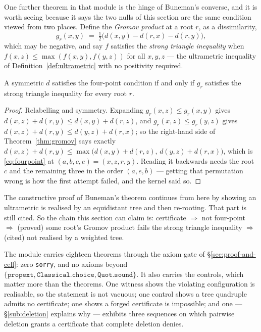 One further theorem in that module is the hinge of Buneman's converse, and it
is worth seeing because it says the two nulls of this section are the same
condition viewed from two places. Define the \emph{Gromov product} at a root
$r$, as a dissimilarity,
\[
  g_r(x,y) \;=\; \tfrac{1}{2}\big(d(x,y) - d(r,x) - d(r,y)\big),
\]
which may be negative, and say $f$ satisfies the \emph{strong triangle
inequality} when $f(x,z) \le \max(f(x,y), f(y,z))$ for all $x,y,z$ --- the
ultrametric inequality of Definition~\ref{def:ultrametric} with no positivity
required.

\begin{theorem}\label{thm:gromov}
A symmetric $d$ satisfies the four-point condition if and only if $g_r$
satisfies the strong triangle inequality for every root $r$.
\end{theorem}

\begin{proof}
Relabelling and symmetry. Expanding $g_r(x,z) \le g_r(x,y)$ gives
$d(x,z) + d(r,y) \le d(x,y) + d(r,z)$, and $g_r(x,z) \le g_r(y,z)$ gives
$d(x,z) + d(r,y) \le d(y,z) + d(r,x)$; so the right-hand side of
Theorem~\ref{thm:gromov} says exactly
$d(x,z) + d(r,y) \le \max\big(d(x,y)+d(r,z),\, d(y,z)+d(r,x)\big)$, which is
\eqref{eq:fourpoint} at $(a,b,c,e) = (x,z,r,y)$. Reading it backwards needs the
root $c$ and the remaining three in the order $(a,e,b)$ --- getting that
permutation wrong is how the first attempt failed, and the kernel said so.
\end{proof}

The constructive proof of Buneman's theorem continues from here by showing an
ultrametric is realised by an equidistant tree and then re-rooting. That part is
still cited. So the chain this section can claim is: certificate $\Rightarrow$
not four-point $\Rightarrow$ (proved) some root's Gromov product fails the strong
triangle inequality $\Rightarrow$ (cited) not realised by a weighted tree.

The module carries eighteen theorems through the axiom gate of
\S\ref{sec:proof-and-cell}: zero \texttt{sorry}, and no axioms beyond
$\{\texttt{propext}, \texttt{Classical.choice}, \texttt{Quot.sound}\}$. It also
carries the controls, which matter more than the theorems. One witness shows the
violating configuration is realisable, so the statement is not vacuous; one
control shows a tree quadruple admits no certificate; one shows a forged
certificate is impossible; and one --- \S\ref{sub:deletion} explains why ---
exhibits three sequences on which pairwise deletion grants a certificate that
complete deletion denies.

